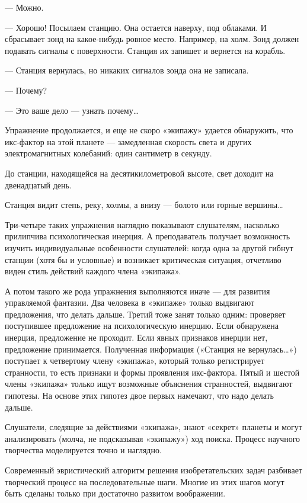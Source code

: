 — Можно.

—  Хорошо!  Посылаем  станцию.  Она  остается  наверху,  под  облаками.  И
сбрасывает  зонд на  какое-нибудь ровное  место. Например,  на холм.  Зонд
должен подавать  сигналы с поверхности.  Станция их запишет и  вернется на
корабль.

— Станция вернулась, но никаких сигналов зонда она не записала.

— Почему?

— Это ваше дело — узнать почему…

Упражнение продолжается, и еще не скоро «экипажу» удается обнаружить,  что
икс-фактор  на  этой  планете  —  замедленная  скорость  света  и   других
электромагнитных колебаний: один сантиметр в секунду.

До станции,  находящейся на  десятикилометровой  высоте, свет  доходит  на
двенадцатый день.

Станция видит степь, реку, холмы, а внизу — болото или горные вершины…

Три-четыре  таких  упражнения  наглядно показывают  слушателям,  насколько
прилипчива психологическая  инерция. А преподаватель  получает возможность
изучить индивидуальные особенности слушателей: когда одна за другой гибнут
станции (хотя бы  и условные) и возникает  критическая ситуация, отчетливо
виден стиль действий каждого члена «экипажа».

А  потом  такого же  рода  упражнения  выполняются  иначе —  для  развития
управляемой   фантазии.  Два   человека  в   «экипаже»  только   выдвигают
предложения, что делать дальше. Третий  тоже занят только одним: проверяет
поступившее  предложение  на   психологическую  инерцию.  Если  обнаружена
инерция,  предложение  не  проходит.  Если явных  признаков  инерции  нет,
предложение принимается.  Полученная информация («Станция  не вернулась…»)
поступает  к  четвертому  члену  «экипажа»,  который  только  регистрирует
странности,  то есть  признаки  и формы  проявления  икс-фактора. Пятый  и
шестой  члены  «экипажа»  только ищут  возможные  объяснения  странностей,
выдвигают гипотезы. На основе этих  гипотез двое первых намечают, что надо
делать дальше.

Слушатели, следящие  за действиями  «экипажа»,  знают «секрет»  планеты  и
могут анализировать (молча, не подсказывая «экипажу») ход поиска.  Процесс
научного творчества моделируется точно и наглядно.

Современный  эвристический   алгоритм   решения   изобретательских   задач
разбивает творческий  процесс на  последовательные  шаги. Многие  из  этих
шагов могут быть сделаны только при достаточно развитом воображении.

